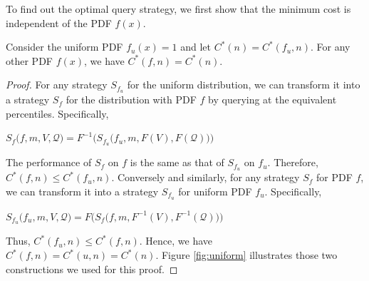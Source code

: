 To find out the optimal query strategy, we first show that the minimum cost
is independent of the PDF $f(x)$.

\begin{lemma}\label{lemma:uniform}
Consider the uniform PDF $f_u(x) = 1$ and let $C^*(n) = C^*(f_u, n)$.
For any other PDF $f(x)$, we have $C^*(f, n) =  C^*(n)$.
\end{lemma}


\begin{proof}
For any strategy $S_{f_u}$ for the uniform distribution, we can transform
it into a strategy $S_f$ for the distribution  with PDF $f$ 
by querying at the equivalent percentiles. Specifically, 

$
S_f\big(f, m, V, \mathcal Q \big) = F^{-1}\Big( S_{f_u}\big( f_u, m, F(V), F (\mathcal Q) \big) \Big)
$

The performance of $S_f$ on $f$ is the same as that of $S_{f_u}$ on $f_u$.
Therefore,  $C^*(f, n) \leq C^*(f_u, n)$.
Conversely and similarly, for any strategy $S_f$
for PDF $f$, we can transform it into a strategy $S_{f_u}$ for uniform PDF
$f_u$. Specifically,

$
S_{f_u}\big(f_u, m, V, \mathcal Q \big) = F\Big( S_f\big( f, m, F^{-1}(V), F^{-1} (\mathcal Q) \big) \Big)
$

Thus, $C^*(f_u, n) \leq C^*(f, n)$.  Hence,  we have $C^*(f, n) = C^*(u, n)
= C^*(n)$. Figure \ref{fig:uniform} 
illustrates those two constructions we used for this proof.
\end{proof}

